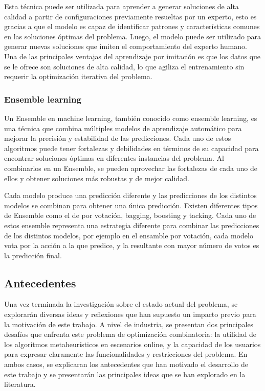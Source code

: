 Esta técnica puede ser utilizada para aprender a generar soluciones de alta
calidad a partir de configuraciones previamente resueltas por un experto, esto
es gracias a que el modelo es capaz de identificar patrones y características
comunes en las soluciones óptimas del problema. Luego, el modelo puede ser
utilizado para generar nuevas soluciones que imiten el comportamiento del
experto humano. Una de las principales ventajas del aprendizaje por imitación
es que los datos que se le ofrece son soluciones de alta calidad, lo que
agiliza el entrenamiento sin requerir la optimización iterativa del problema.

\subsubsection{Ensemble learning}
Un Ensemble\cite{Kundu_2023} en machine learning, también conocido como ensemble learning, es
una técnica que combina múltiples modelos de aprendizaje automático para
mejorar la precisión y estabilidad de las predicciones. Cada uno de estos
algoritmos puede tener fortalezas y debilidades en términos de su capacidad
para encontrar soluciones óptimas en diferentes instancias del problema. Al
combinarlos en un Ensemble, se pueden aprovechar las fortalezas de cada uno de
ellos y obtener soluciones más robustas y de mejor calidad.\medskip

Cada modelo produce una predicción diferente y las predicciones de los
distintos modelos se combinan para obtener una única predicción. Existen
diferentes tipos de Ensemble como el de por votación, bagging, boosting y
tacking\cite{Ensemble_Algorithms}. Cada uno de estos ensemble representa una 
estrategia diferente para combinar las predicciones de los distintos modelos, 
por ejemplo en el ensamble por votación, cada modelo vota por la acción a la 
que predice, y la resultante con mayor número de votos es la predicción final.

\subsection{Antecedentes}
Una vez terminada la investigación sobre el estado actual del problema, se
explorarán diversas ideas y reflexiones que han supuesto un impacto previo para
la motivación de este trabajo. A nivel de industria, se presentan dos
principales desafíos que enfrenta este problema de optimización combinatoria:
la utilidad de los algoritmos metaheurísticos en escenarios online, y la
capacidad de los usuarios para expresar claramente las funcionalidades y
restricciones del problema. En ambos casos, se explicaran los antecedentes que
han motivado el desarrollo de este trabajo y se presentarán las principales
ideas que se han explorado en la literatura.\medskip

